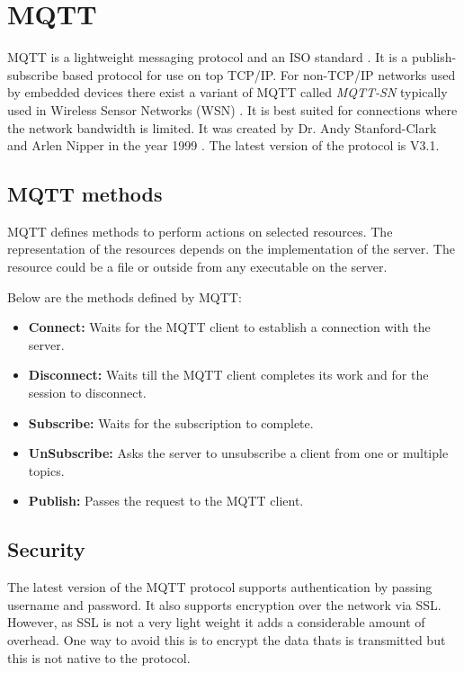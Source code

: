\section{MQTT}

MQTT is a lightweight messaging protocol \parencite{locke2010mq} and an ISO standard \parencite{mqtt_iso}. It is a publish-subscribe based protocol for use on top TCP/IP. For non-TCP/IP networks used by embedded devices there exist a variant of MQTT called \textit{MQTT-SN} typically used in Wireless Sensor Networks (WSN) \parencite{4554519}. It is best suited for connections where the network bandwidth is limited. It was created by Dr. Andy Stanford-Clark and Arlen Nipper in the year 1999 \parencite{mqtt_faq}. The latest version of the protocol is V3.1. 

\subsection{MQTT methods}

MQTT defines methods to perform actions on selected resources. The representation of the resources depends on the implementation of the server. The resource could be a file or outside from any executable on the server.

Below are the methods defined by MQTT:

\begin{itemize}
    \item\textbf{Connect:}
        Waits for the MQTT client to establish a connection with the server.

    \item\textbf{Disconnect:}
        Waits till the MQTT client completes its work and for the session to disconnect.

    \item\textbf{Subscribe:}
        Waits for the subscription to complete.

    \item\textbf{UnSubscribe:}
        Asks the server to unsubscribe a client from one or multiple topics.

    \item\textbf{Publish:}
        Passes the request to the MQTT client.

\end{itemize}

\subsection{Security}

The latest version of the MQTT protocol supports authentication by passing username and password. It also supports encryption over the network via SSL. However, as SSL is not a very light weight it adds a considerable amount of overhead. One way to avoid this is to encrypt the data thats is transmitted but this is not native to the protocol.

